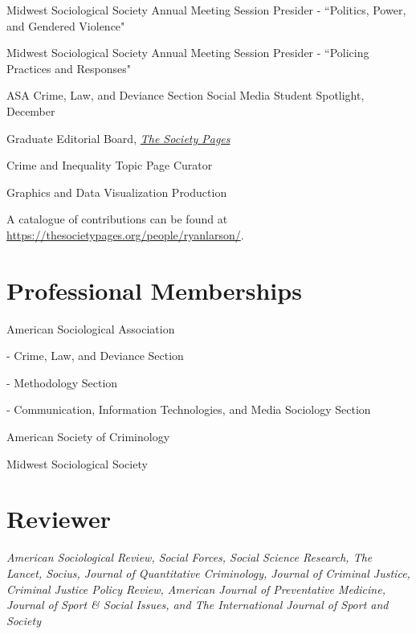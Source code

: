 \documentclass[letterpaper]{article}
\newenvironment{publist}{%
  \begin{list}{}{%
    \setlength{\leftmargin}{0cm}   %
    \setlength{\labelwidth}{2cm}     %
    \setlength{\labelsep}{0.5cm}     %
  }%
}{%
  \end{list}%
}
\renewenvironment{itemize}{
  \begin{list}{}{
    \setlength{\leftmargin}{1.5em}
  }
}{
  \end{list}
}
\begin{document}
\begin{publist}

\item[\textbf{2024}] Midwest Sociological Society Annual Meeting Session Presider - ``Politics, Power, and Gendered Violence"

\item[\textbf{2023}] Midwest Sociological Society Annual Meeting Session Presider - ``Policing Practices and Responses"

\item[\textbf{2019}] ASA Crime, Law, and Deviance Section Social Media Student Spotlight, December

\item[\textbf{2014-2019}]  Graduate Editorial Board, \href{http://thesocietypages.org/}{\textit{The Society Pages}}
\begin{itemize}
\item Crime and Inequality Topic Page Curator
\item Graphics and Data Visualization Production
\item A catalogue of contributions can be found at \href{https://thesocietypages.org/people/ryanlarson/}{https://thesocietypages.org/people/ryanlarson/}.
\end{itemize}

\end{publist}


\section*{\textbf{Professional Memberships}}
\begin{publist}

\item American Sociological Association
\begin{itemize}
\item - Crime, Law, and Deviance Section
\item - Methodology Section
\item - Communication, Information Technologies, and Media Sociology Section
\end{itemize}
\item American Society of Criminology
\item Midwest Sociological Society

\end{publist}

\section*{\textbf{Reviewer}}

\textit{American Sociological Review, Social Forces, Social Science Research, The Lancet, Socius, Journal of Quantitative Criminology, Journal of Criminal Justice, Criminal Justice Policy Review, American Journal of Preventative Medicine, Journal of Sport \& Social Issues, and The International Journal of Sport and Society}
\end{document}
